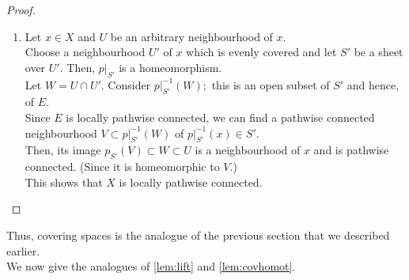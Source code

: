\documentclass[12pt]{article}
\theoremstyle{definition}
\numberwithin{thm}{section}
\begin{document}
\begin{proof}
\begin{enumerate}
		\item Let $x \in X$ and $U$ be an arbitrary neighbourhood of $x.$\\
		Choose a neighbourhood $U'$ of $x$ which is evenly covered and let $S'$ be a sheet over $U'.$ Then, $p|_{S'}$ is a homeomorphism. \\
		Let $W = U \cap U'.$ Consider $p|_{S'}^{-1}(W);$ this is an open subset of $S'$ and hence, of $E.$\\
		Since $E$ is locally pathwise connected, we can find a pathwise connected neighbourhood $V \subset p|_{S'}^{-1}(W)$ of $p|_{S'}^{-1}(x) \in S'.$\\
		Then, its image $p_{S'}(V) \subset W \subset U$ is a neighbourhood of $x$ and is pathwise connected. (Since it is homeomorphic to $V.$)\\
		This shows that $X$ is locally pathwise connected. \qedhere
	\end{enumerate}
\end{proof}

Thus, covering spaces is the analogue of the previous section that we described earlier.\\
We now give the analogues of \cref{lem:lift} and \cref{lem:covhomot}.
\end{document}
